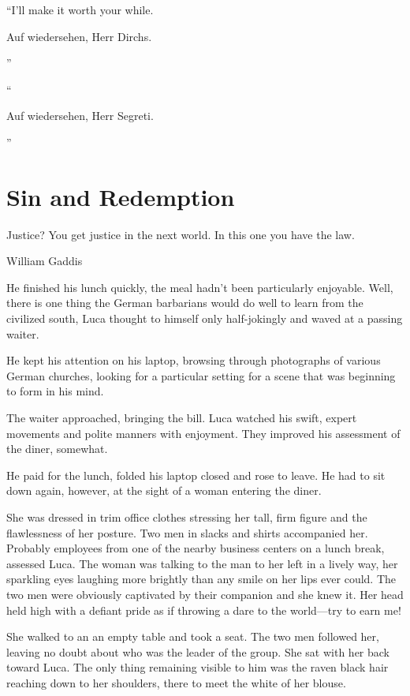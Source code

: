 ``I'll make it worth your while. \begin{otherlanguage}{ngerman}Auf wiedersehen, Herr Dirchs.\end{otherlanguage}''

``\begin{otherlanguage}{ngerman}Auf wiedersehen, Herr Segreti.\end{otherlanguage}''

\chapter{Sin and Redemption}

\epigraph{Justice? You get justice in the next world. In this one you have the law.}{William Gaddis}

\firstparagraph

He finished his lunch quickly, the meal hadn't been particularly enjoyable. Well, there is one thing the German barbarians would do well to learn from the civilized south, Luca thought to himself only half-jokingly and waved at a passing waiter.

He kept his attention on his laptop, browsing through photographs of various German churches, looking for a particular setting for a scene that was beginning to form in his mind.

The waiter approached, bringing the bill. Luca watched his swift, expert movements and polite manners with enjoyment. They improved his assessment of the diner, somewhat.

He paid for the lunch, folded his laptop closed and rose to leave. He had to sit down again, however, at the sight of a woman entering the diner.

She was dressed in trim office clothes stressing her tall, firm figure and the flawlessness of her posture. Two men in slacks and shirts accompanied her. Probably employees from one of the nearby business centers on a lunch break, assessed Luca. The woman was talking to the man to her left in a lively way, her sparkling eyes laughing more brightly than any smile on her lips ever could. The two men were obviously captivated by their companion and she knew it. Her head held high with a defiant pride as if throwing a dare to the world---try to earn me!

She walked to an an empty table and took a seat. The two men followed her, leaving no doubt about who was the leader of the group. She sat with her back toward Luca. The only thing remaining visible to him was the raven black hair reaching down to her shoulders, there to meet the white of her blouse.

